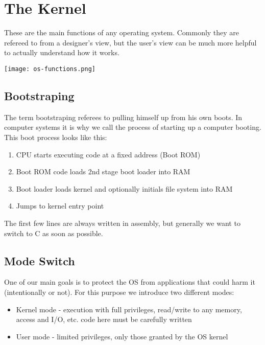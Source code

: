 \section{The Kernel}

These are the main functions of any operating system. Commonly they are refereed to from a designer's view, but the user's view can be much more helpful to actually understand how it works.

\begin{center}
	\texttt{[image: os-functions.png]}
\end{center}


\subsection{Bootstraping}

The term bootstraping referees to pulling himself up from his own boots. In computer systems it is why we call the process of starting up a computer booting. This boot process looks like this:

\begin{enumerate}
	\item CPU starts executing code at a fixed address (Boot ROM)
	\item Boot ROM code loads 2nd stage boot loader into RAM
	\item Boot loader loads kernel and optionally initials file system into RAM
	\item Jumps to kernel entry point
\end{enumerate}

The first few lines are always written in assembly, but generally we want to switch to C as soon as possible.


\subsection{Mode Switch}

One of our main goals is to protect the OS from applications that could harm it (intentionally or not). For this purpose we introduce two different modes:

\begin{itemize}
	\item Kernel mode - execution with full privileges, read/write to any memory, access and I/O, etc. code here must be carefully written
	\item User mode - limited privileges, only those granted by the OS kernel
\end{itemize}

